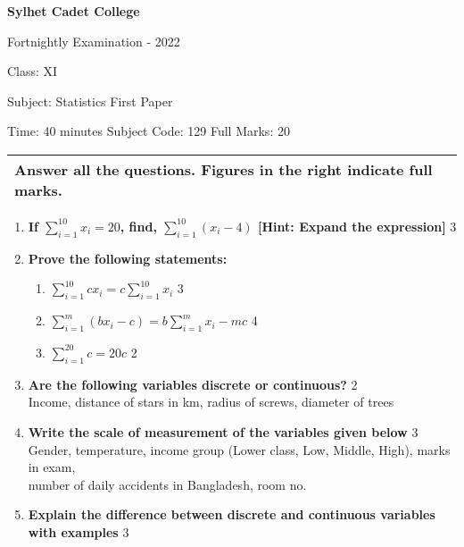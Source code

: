 \documentclass{article}
\begin{document}
\begin{center}
  \bfseries\large
  Sylhet Cadet College

\normalsize
Fortnightly Examination - 2022

  Class: XI

  Subject: Statistics First Paper

  Time: 40 minutes \qquad \qquad  \qquad \qquad Subject Code: 129  \qquad  \qquad \qquad  \qquad Full Marks: 20

\end{center}

\noindent
\begin{tabular}{p{\dimexpr\linewidth-2\tabcolsep}}
  Answer all the questions. Figures in the right indicate full marks.\\
  \hline
\end{tabular}

\begin{enumerate}
  \item
  \textbf{If $\displaystyle \sum_{i=1}^{10} x_i=20$, find, $ \displaystyle \sum_{i=1}^{10} (x_i-4)$ [Hint: Expand the expression]}  \hfill 3


 \item
	  \textbf{Prove the following statements:}
  \begin{enumerate}
    \item
	$\displaystyle \sum_{i=1}^{10} cx_i =c \sum_{i=1}^{10} x_i$ \hfill 3
    \item
	$\displaystyle \sum_{i=1}^{m} (bx_i - c) = b \sum_{i=1}^{m} x_i - mc$ \hfill 4
    \item
	$\displaystyle \sum_{i=1}^{20} c = 20c$ \hfill 2
\end{enumerate}

	\item
	\textbf{Are the following variables discrete or continuous? } \hfill 2 \\
	Income, distance of stars in km, radius of screws, diameter of trees 
	
	\item
	\textbf{Write the scale of measurement  of the variables given below} \hfill 3 \\
	Gender, temperature, income group (Lower class, Low, Middle, High),  marks in exam, \\ number of daily accidents in Bangladesh, room no. 

	\item
	\textbf{Explain the difference between discrete and continuous variables with examples} \hfill 3


\end{enumerate}
\end{document}
